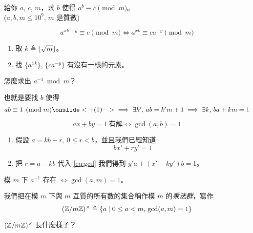\documentclass[standalone]{beamer}
\begin{document}
\begin{frame}
  \begin{problem}
    給你 $a$, $c$, $m$，求 $b$ 使得 $a^b \equiv c \pmod{m}$。\\
    ($a, b, m \leq 10^{9}$, $m$ 是質數)
  \end{problem} \pause \disskip
  \[ a^{xk + y} \equiv c \pmod{m} \iff a^{xk} \equiv c a^{-y} \pmod{m} \]
  \pause \disskip
  \begin{enumerate}
    \item 取 $k \triangleq \lfloor \sqrt{m} \rfloor$。
    \item 找 $\{a^{xk}\}$, $\{c a^{-y}\}$ 有沒有一樣的元素。
  \end{enumerate}
  \pause
  \begin{missue}
    \centering
    怎麼求出 $a^{-1} \bmod m$？
  \end{missue}
\end{frame}

\begin{frame}
  也就是要找 $b$ 使得
  \[ a b \equiv 1 \pmod{m} \onslide<+(1)->{\implies \exists k',\, ab = k'm + 1 \implies \exists k,\, ba + km = 1}\]
  \pause \disskip
  \begin{theorem}[$ax + by = 1$ 有解的條件] \vspace*{-0.5\baselineskip}
    \[ ax + by = 1 \ \text{有解} \iff \gcd(a, b) = 1 \]
  \end{theorem}
  \pause \disskip
  \begin{enumerate}[<+->]
    \item 假設 $a = kb + r, \ 0 \leq r < b$，並且我們已經知道 
      \begin{equation}
        bx' + ry' = 1 \label{eq:gcd}
      \end{equation}
    \item 把 $r = a - kb$ 代入 \eqref{eq:gcd} 我們得到 $y'a + (x' - ky')b = 1$。
  \end{enumerate}
\end{frame}

\begin{frame}
  \begin{theorem}[模逆元存在的條件]
   模 $m$ 下 $a^{-1}$ 存在 $\iff \gcd(a, m) = 1$。
  \end{theorem}
  \pause

  我們把在模 $m$ 下與 $m$ 互質的所有數的集合稱作模 $m$ 的\emph{乘法群}，寫作
  \[ (\mathbb{Z} / m\mathbb{Z})^\times \triangleq \{ a \mid 0 \leq a < m,\, \gcd(a, m) = 1 \} \]
  \pause
  \begin{missue}
    \centering
    $(\mathbb{Z} / m\mathbb{Z})^\times$ 長什麼樣子？
  \end{missue}
\end{frame}
\end{document}
